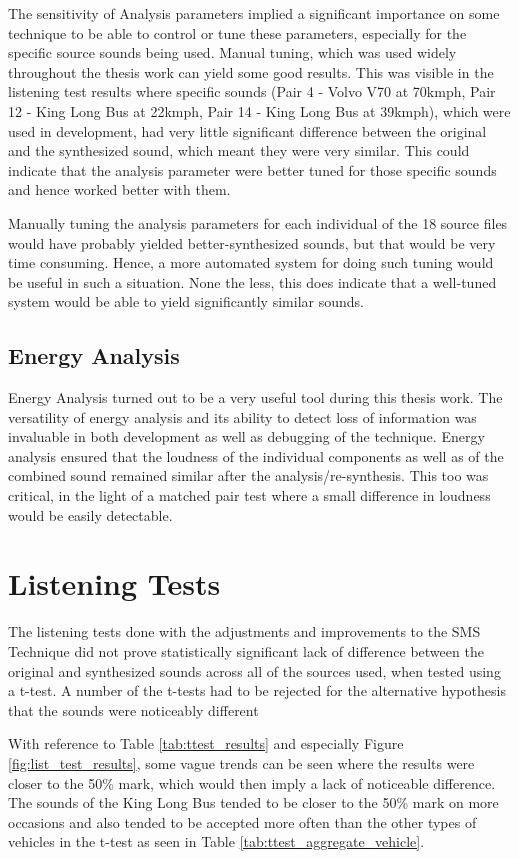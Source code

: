 The sensitivity of Analysis parameters implied a significant importance on some technique to be able to control or tune these parameters, especially for the specific source sounds being used. Manual tuning, which was used widely throughout the thesis work can yield some good results. This was visible in the listening test results where specific sounds (Pair 4 - Volvo V70 at 70kmph, Pair 12 - King Long Bus at 22kmph, Pair 14 - King Long Bus at 39kmph), which were used in development, had very little significant difference between the original and the synthesized sound, which meant they were very similar. This could indicate that the analysis parameter were better tuned for those specific sounds and hence worked better with them.

Manually tuning the analysis parameters for each individual of the 18 source files would have probably yielded better-synthesized sounds, but that would be very time consuming. Hence, a more automated system for doing such tuning would be useful in such a situation. None the less, this does indicate that a well-tuned system would be able to yield significantly similar sounds.

\subsection{Energy Analysis}
Energy Analysis turned out to be a very useful tool during this thesis work. The versatility of energy analysis and its ability to detect loss of information was invaluable in both development as well as debugging of the technique. Energy analysis ensured that the loudness of the individual components as well as of the combined sound remained similar after the analysis/re-synthesis. This too was critical, in the light of a matched pair test where a small difference in loudness would be easily detectable.

\section{ Listening Tests}
The listening tests done with the adjustments and improvements to the SMS Technique did not prove statistically significant lack of difference between the original and synthesized sounds across all of the sources used, when tested using a t-test. A number of the t-tests had to be rejected for the alternative hypothesis that the sounds were noticeably different

With reference to Table \ref{tab:ttest_results} and especially Figure  \ref{fig:list_test_results}, some vague trends can be seen where the results were closer to the 50\% mark, which would then imply a lack of noticeable difference. The sounds of the King Long Bus tended to be closer to the 50\% mark on more occasions and also tended to be accepted more often than the other types of vehicles in the t-test as seen in Table \ref{tab:ttest_aggregate_vehicle}.

